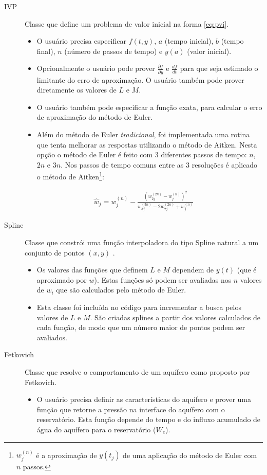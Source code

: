 \documentclass[final,5p]{elsarticle}
\numberwithin{equation}{section}
\begin{document}
        \begin{description}
            \item[IVP] Classe que define um problema de valor inicial na forma \ref{eq:pvi}.
            \begin{itemize}
                \item O usuário precisa especificar $f(t,y)$, $a$ (tempo inicial), $b$ (tempo final), $n$ (número de passos de tempo) e $y(a)$ (valor inicial).
                \item Opcionalmente o usuário pode prover $\frac{\partial f}{\partial y}$ e $\frac{df}{dt}$ para que seja estimado o limitante do erro de aproximação. O usuário também pode prover diretamente os valores de $L$ e $M$.
                \item O usuário também pode especificar a função exata, para calcular o erro de aproximação do método de Euler.
                \item Além do método de Euler \emph{tradicional}, foi implementada uma rotina que tenta melhorar as respostas utilizando o método de Aitken. Nesta opção o método de Euler é feito com 3 diferentes passos de tempo: $n$, $2 n$ e $3 n$. Nos passos de tempo comuns entre as 3 resoluções é aplicado o método de Aitken\footnote{$w^{(n)}_j$ é a aproximação de $y(t_j)$ de uma aplicação do método de Euler com $n$ passos.}:
            \end{itemize}

                \begin{align}
                    \widehat{w}_j = w^{(n)}_j - \frac{\left(w^{(2n)}_{2j} - w^{(n)}_j\right) ^2}{w^{(3n)}_{3j}-2w^{(2n)}_{2j}+w^{(n)}_j} \label{eq:aitken}
                \end{align}

            \item[Spline] Classe que constrói uma função interpoladora do tipo Spline natural a um conjunto de pontos $(x,y)$ \cite{relatoriosplinesnaturais}.
            \begin{itemize}
                \item Os valores das funções que definem $L$ e $M$ dependem de $y(t)$ (que é aproximado por $w$). Estas funções só podem ser avaliadas nos $n$ valores de $w_i$ que são calculados pelo método de Euler.
                \item Esta classe foi incluída no código para incrementar a busca pelos valores de $L$ e $M$. São criadas splines a partir dos valores calculados de cada função, de modo que um número maior de pontos podem ser avaliados.
            \end{itemize}
            \item[Fetkovich] Classe que resolve o comportamento de um aquífero como proposto por Fetkovich.
            \begin{itemize}
                \item O usuário precisa definir as características do aquífero e prover uma função que retorne a pressão na interface do aquífero com o reservatório. Esta função depende do tempo e do influxo acumulado de água do aquífero para o reservatório ($W_e$).
            \end{itemize}
        \end{description}
\end{document}
